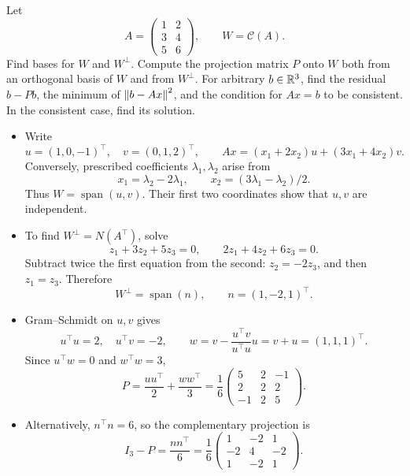 \begin{example}\label{example:06:constraint}
Let
\[
A=\begin{pmatrix}1&2\\3&4\\5&6\end{pmatrix},\qquad W=\mathcal C(A).
\]
Find bases for \(W\) and \(W^\perp\). Compute the projection matrix
\(P\) onto \(W\) both from an orthogonal basis of \(W\) and from
\(W^\perp\). For arbitrary \(b\in\mathbb R^3\), find the residual
\(b-Pb\), the minimum of \(\left\lVert b-Ax\right\rVert^2\), and the condition for
\(Ax=b\) to be consistent. In the consistent case, find its solution.
\par\smallskip
{}
\begin{itemize}
\item Write
  \[
  u=(1,0,-1)^\top,\quad v=(0,1,2)^\top,\qquad
  Ax=(x_1+2x_2)u+(3x_1+4x_2)v.
  \]
  Conversely, prescribed coefficients \(\lambda_1,\lambda_2\) arise from
  \[
  x_1=\lambda_2-2\lambda_1,\qquad
  x_2=(3\lambda_1-\lambda_2)/2.
  \]
  Thus \(W=\operatorname{span}(u,v)\). Their first two coordinates show
  that \(u,v\) are independent.
\item To find \(W^\perp=N(A^\top)\), solve
  \[
  z_1+3z_2+5z_3=0,\qquad 2z_1+4z_2+6z_3=0.
  \]
  Subtract twice the first equation from the second:
  \(z_2=-2z_3\), and then \(z_1=z_3\). Therefore
  \[
  W^\perp=\operatorname{span}(n),\qquad n=(1,-2,1)^\top.
  \]
\end{itemize}
\begin{itemize}
\item Gram--Schmidt on \(u,v\) gives
  \[
  u^\top u=2,\quad u^\top v=-2,\qquad
  w=v-\frac{u^\top v}{u^\top u}u=v+u=(1,1,1)^\top.
  \]
  Since \(u^\top w=0\) and \(w^\top w=3\),
  \[
  P=\frac{uu^\top}{2}+\frac{ww^\top}{3}
   =\frac16\begin{pmatrix}5&2&-1\\2&2&2\\-1&2&5\end{pmatrix}.
  \]
\item Alternatively, \(n^\top n=6\), so the complementary projection is
  \[
  I_3-P=\frac{nn^\top}{6}
  =\frac16\begin{pmatrix}1&-2&1\\-2&4&-2\\1&-2&1\end{pmatrix}.
\]
\end{itemize}
\end{example}
